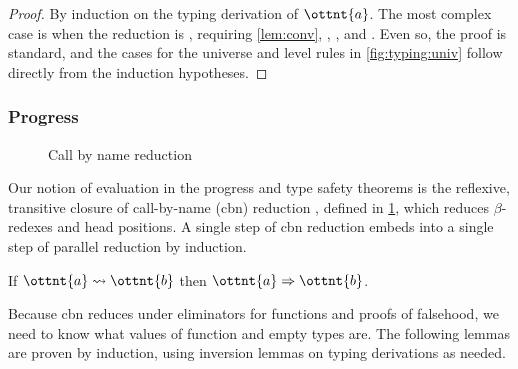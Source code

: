 \documentclass[a4paper,UKenglish,cleveref,autoref,thm-restate]{lipics-v2021}
\begin{document}
\begin{proof}
  By induction on the typing derivation of $\ottnt{a}$.
  The most complex case is when the reduction is ,
  requiring \cref{lem:conv}, ,
  , and .
  Even so, the proof is standard,
  and the cases for the universe and level rules in \cref{fig:typing:univ}
  follow directly from the induction hypotheses.
\end{proof}

\subsubsection{Progress}

\begin{figure}
\caption{Call by name reduction}
\label{fig:cbn}
\end{figure}

Our notion of evaluation in the progress and type safety theorems
is the reflexive, transitive closure 
of call-by-name (cbn) reduction ,
defined in \cref{fig:cbn},
which reduces $\beta$-redexes and head positions.
A single step of cbn reduction embeds into
a single step of parallel reduction by induction.

\begin{lemma}
  If $ \ottnt{a}  \rightsquigarrow  \ottnt{b} $ then $ \ottnt{a}  \Rightarrow  \ottnt{b} $.
\end{lemma}

Because cbn reduces under eliminators for functions and proofs of falsehood,
we need to know what values of function and empty types are.
The following lemmas are proven by induction,
using inversion lemmas on typing derivations as needed.
\end{document}

